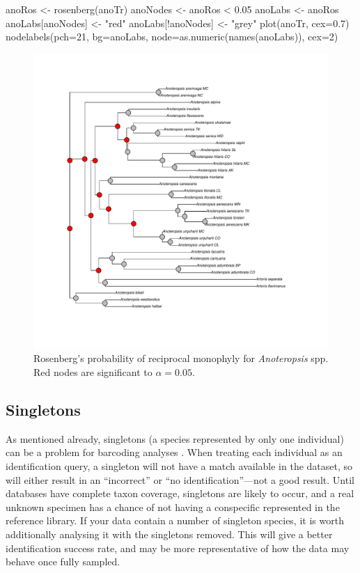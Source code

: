 \documentclass{article}
\begin{document}
\begin{console}
anoRos <- rosenberg(anoTr)
anoNodes <- anoRos < 0.05
anoLabs <- anoRos
anoLabs[anoNodes] <- "red"
anoLabs[!anoNodes] <- "grey"
plot(anoTr, cex=0.7)
nodelabels(pch=21, bg=anoLabs, node=as.numeric(names(anoLabs)), cex=2)
\end{console}

\begin{figure}[p]
	\centering
	\includegraphics[width=1\textwidth, trim=3cm 1cm 3cm 0cm]{rosenbergs}
	\caption{Rosenberg's probability of reciprocal monophyly for  \emph{Anoteropsis} spp. Red nodes are significant to $\alpha = 0.05$.}
	\label{rosenbergs.fig}
\end{figure}

\subsection{Singletons}

As mentioned already, singletons (a species represented by only one individual) can be a problem for barcoding analyses \citep{Lim2011}. When treating each individual as an identification query, a singleton will not have a match available in the dataset, so will either result in an ``incorrect'' or ``no identification''---not a good result. Until databases have complete taxon coverage, singletons are likely to occur, and a real unknown specimen has a chance of not having a conspecific represented in the reference library. If your data contain a number of singleton species, it is worth additionally analysing it with the singletons removed. This will give a better identification success rate, and may be more representative of how the data may behave once fully sampled.
\end{document}
